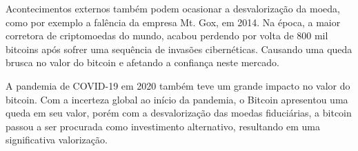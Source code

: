 Acontecimentos externos também podem ocasionar a desvalorização da moeda, como por exemplo a falência da empresa Mt. Gox, em 2014. Na época, a maior corretora de criptomoedas do mundo, acabou perdendo por volta de 800 mil bitcoins após sofrer uma sequência de invasões cibernéticas. Causando uma queda brusca no valor do bitcoin e afetando a confiança neste mercado.

A pandemia de COVID-19 em 2020 também teve um grande impacto no valor do bitcoin. Com a incerteza global ao início da pandemia, o Bitcoin apresentou uma queda em seu valor, porém com a desvalorização das moedas fiduciárias, a bitcoin passou a ser procurada como investimento alternativo, resultando em uma significativa valorização.